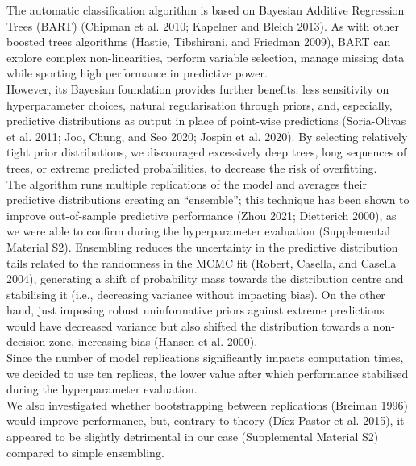 \documentclass{article}
\begin{document}
The automatic classification algorithm is based on Bayesian Additive
Regression Trees (BART) (Chipman et al. 2010; Kapelner and Bleich 2013).
As with other boosted trees algorithms (Hastie, Tibshirani, and Friedman
2009), BART can explore complex non-linearities, perform variable
selection, manage missing data while sporting high performance in
predictive power.\\
However, its Bayesian foundation provides further benefits: less
sensitivity on hyperparameter choices, natural regularisation through
priors, and, especially, predictive distributions as output in place of
point-wise predictions (Soria-Olivas et al. 2011; Joo, Chung, and Seo
2020; Jospin et al. 2020). By selecting relatively tight prior
distributions, we discouraged excessively deep trees, long sequences of
trees, or extreme predicted probabilities, to decrease the risk of
overfitting.\\
The algorithm runs multiple replications of the model and averages their
predictive distributions creating an ``ensemble''; this technique has
been shown to improve out-of-sample predictive performance (Zhou 2021;
Dietterich 2000), as we were able to confirm during the hyperparameter
evaluation (Supplemental Material S2). Ensembling reduces the
uncertainty in the predictive distribution tails related to the
randomness in the MCMC fit (Robert, Casella, and Casella 2004),
generating a shift of probability mass towards the distribution centre
and stabilising it (i.e., decreasing variance without impacting bias).
On the other hand, just imposing robust uninformative priors against
extreme predictions would have decreased variance but also shifted the
distribution towards a non-decision zone, increasing bias (Hansen et al.
2000).\\
Since the number of model replications significantly impacts computation
times, we decided to use ten replicas, the lower value after which
performance stabilised during the hyperparameter evaluation.\\
We also investigated whether bootstrapping between replications (Breiman
1996) would improve performance, but, contrary to theory (Díez-Pastor et
al. 2015), it appeared to be slightly detrimental in our case
(Supplemental Material S2) compared to simple ensembling.\\
\end{document}
